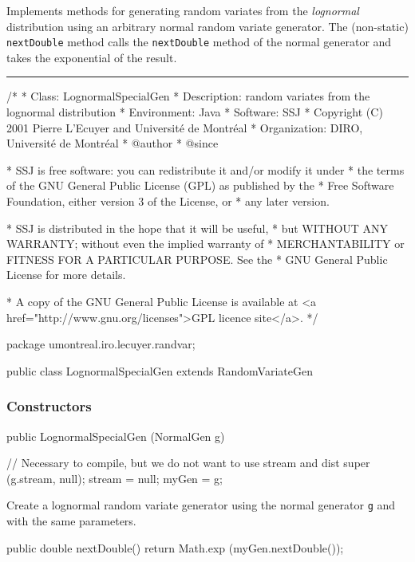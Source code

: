 
Implements methods for generating random variates from the 
{\em lognormal\/} distribution using an arbitrary normal random 
variate generator.
The (non-static) \texttt{nextDouble} method calls the \texttt{nextDouble} 
method of the normal generator and takes the exponential of the result.


\bigskip\hrule

\begin{code}
\begin{hide}
/*
 * Class:        LognormalSpecialGen
 * Description:  random variates from the lognormal distribution
 * Environment:  Java
 * Software:     SSJ 
 * Copyright (C) 2001  Pierre L'Ecuyer and Université de Montréal
 * Organization: DIRO, Université de Montréal
 * @author       
 * @since

 * SSJ is free software: you can redistribute it and/or modify it under
 * the terms of the GNU General Public License (GPL) as published by the
 * Free Software Foundation, either version 3 of the License, or
 * any later version.

 * SSJ is distributed in the hope that it will be useful,
 * but WITHOUT ANY WARRANTY; without even the implied warranty of
 * MERCHANTABILITY or FITNESS FOR A PARTICULAR PURPOSE.  See the
 * GNU General Public License for more details.

 * A copy of the GNU General Public License is available at
   <a href="http://www.gnu.org/licenses">GPL licence site</a>.
 */
\end{hide}
package umontreal.iro.lecuyer.randvar;\begin{hide}
\end{hide}

public class LognormalSpecialGen extends RandomVariateGen \begin{hide} {

   NormalGen myGen;
\end{hide}\end{code}

\subsubsection* {Constructors}

\begin{code}
   public LognormalSpecialGen (NormalGen g) \begin{hide} {
      // Necessary to compile, but we do not want to use stream and dist
      super (g.stream, null);
      stream = null;
      myGen = g;
   }\end{hide}
\end{code}
 \begin{tabb}  Create a lognormal random variate generator 
   using the normal generator \texttt{g} and with the same parameters.
 \end{tabb}

\begin{code}\begin{hide} 

   public double nextDouble() {
      return Math.exp (myGen.nextDouble());
   }\end{hide}
\begin{hide}
}\end{hide}
\end{code}
